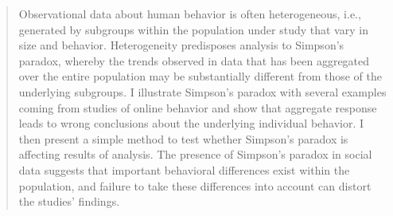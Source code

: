 \documentclass{svjour3}
\begin{document}
\begin{abstract} %


Observational data about human behavior is often heterogeneous, i.e., generated by subgroups within the population under study that vary in size and behavior. Heterogeneity predisposes analysis to Simpson's paradox, whereby the trends observed in data that has been aggregated over the entire population may be substantially different from those of the underlying subgroups. I illustrate Simpson's paradox with several examples coming from studies of online behavior and show that aggregate response leads to wrong conclusions about the underlying individual behavior. I then present a simple method to test whether Simpson's paradox is affecting results of analysis.
The presence of Simpson's paradox in social data suggests that important behavioral differences exist within the population, and failure to take these differences into account can distort the studies' findings.


\end{abstract}
\end{document}
